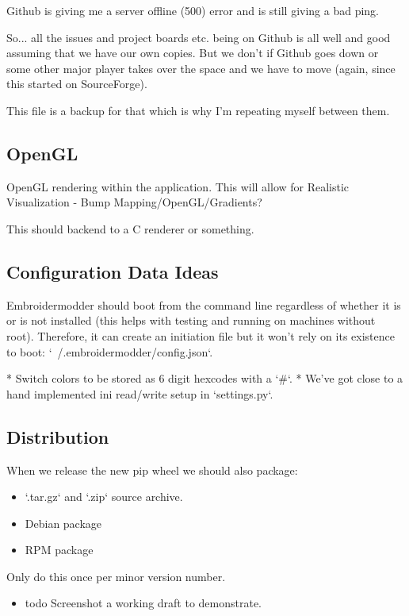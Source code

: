 Github is giving me a server offline (500) error and is still giving a bad ping.

So... all the issues and project boards etc. being on Github is all well and
good assuming that we have our own copies. But we don't if Github goes down or
some other major player takes over the space and we have to move (again, since
this started on SourceForge).

This file is a backup for that which is why I'm repeating myself between them.

\subsection{OpenGL}

OpenGL rendering within the application. This will allow for Realistic Visualization - Bump
Mapping/OpenGL/Gradients?

This should backend to a C renderer or something.

\subsection{Configuration Data Ideas}

Embroidermodder should boot from the command line regardless of whether it is or is not
installed (this helps with testing and running on machines without root). Therefore, it can
create an initiation file but it won't rely on its existence to boot:
`~/.embroidermodder/config.json`.

* Switch colors to be stored as 6 digit hexcodes with a `#`.
* We've got close to a hand implemented ini read/write setup in `settings.py`.

\subsection{Distribution}

When we release the new pip wheel we should also package:

\begin{itemize}
\item `.tar.gz` and `.zip` source archive.
\item Debian package
\item RPM package
\end{itemize}

Only do this once per minor version number.

\begin{itemize}
\item todo Screenshot a working draft to demonstrate.
\end{itemize}

